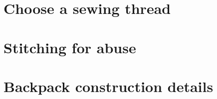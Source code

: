 \section{Choose a sewing thread}


\section{Stitching for abuse}


\section{Backpack construction details}\label{sec:construction-details}

